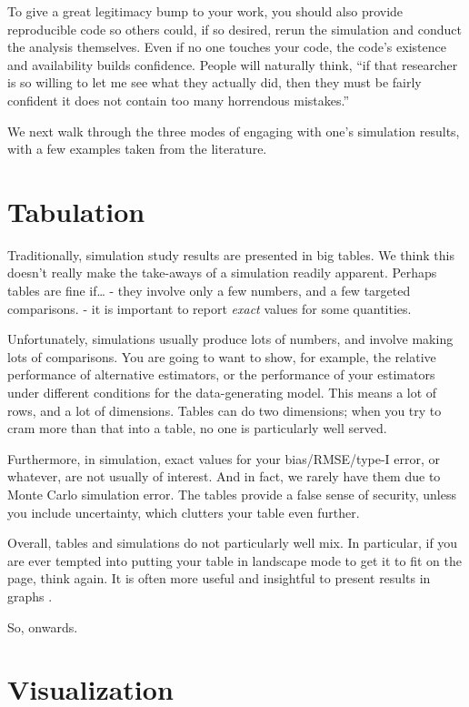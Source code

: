 \documentclass[
]{book}
\begin{document}
To give a great legitimacy bump to your work, you should also provide reproducible code so others could, if so desired, rerun the simulation and conduct the analysis themselves.
Even if no one touches your code, the code's existence and availability builds confidence.
People will naturally think, ``if that researcher is so willing to let me see what they actually did, then they must be fairly confident it does not contain too many horrendous mistakes.''

We next walk through the three modes of engaging with one's simulation results, with a few examples taken from the literature.

\section{Tabulation}\label{tabulation}

Traditionally, simulation study results are presented in big tables.
We think this doesn't really make the take-aways of a simulation readily apparent.
Perhaps tables are fine if\ldots{}
- they involve only a few numbers, and a few targeted comparisons.
- it is important to report \emph{exact} values for some quantities.

Unfortunately, simulations usually produce lots of numbers, and involve making lots of comparisons.
You are going to want to show, for example, the relative performance of alternative estimators, or the performance of your estimators under different conditions for the data-generating model.
This means a lot of rows, and a lot of dimensions.
Tables can do two dimensions; when you try to cram more than that into a table, no one is particularly well served.

Furthermore, in simulation, exact values for your bias/RMSE/type-I error, or whatever, are not usually of interest. And in fact, we rarely have them due to Monte Carlo simulation error.
The tables provide a false sense of security, unless you include uncertainty, which clutters your table even further.

Overall, tables and simulations do not particularly well mix.
In particular, if you are ever tempted into putting your table in landscape mode to get it to fit on the page, think again.
It is often more useful and insightful to present results in graphs \citep{gelman2002let}.

So, onwards.

\section{Visualization}\label{visualization}
\end{document}
